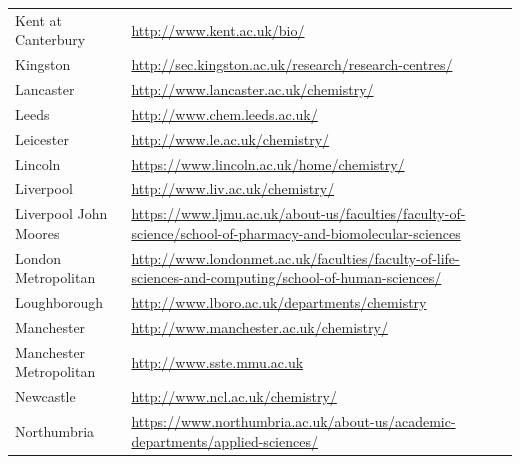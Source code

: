\begin{tabular}{||l|l}
 Kent at Canterbury                 & \url{http://www.kent.ac.uk/bio/}                                                                                                           \\
 Kingston                           & \url{http://sec.kingston.ac.uk/research/research-centres/}                                                                                 \\
 Lancaster                          & \url{http://www.lancaster.ac.uk/chemistry/}                                                                                                \\
 Leeds                              & \url{http://www.chem.leeds.ac.uk/}                                                                                                         \\
 Leicester                          & \url{http://www.le.ac.uk/chemistry/}                                                                                                       \\
 Lincoln                            & \url{https://www.lincoln.ac.uk/home/chemistry/}                                                                                            \\
 Liverpool                          & \url{http://www.liv.ac.uk/chemistry/}                                                                                                      \\
 Liverpool John Moores              & \url{https://www.ljmu.ac.uk/about-us/faculties/faculty-of-science/school-of-pharmacy-and-biomolecular-sciences}                            \\
 London Metropolitan                & \url{http://www.londonmet.ac.uk/faculties/faculty-of-life-sciences-and-computing/school-of-human-sciences/}                                \\
 Loughborough                       & \url{http://www.lboro.ac.uk/departments/chemistry}                                                                                         \\
 Manchester                         & \url{http://www.manchester.ac.uk/chemistry/}                                                                                               \\
 Manchester Metropolitan            & \url{http://www.sste.mmu.ac.uk}                                                                                                            \\
 Newcastle                          & \url{http://www.ncl.ac.uk/chemistry/}                                                                                                      \\
 Northumbria                        & \url{https://www.northumbria.ac.uk/about-us/academic-departments/applied-sciences/}                                                        
 \end{tabular}
 
